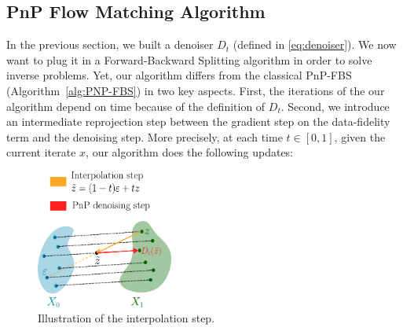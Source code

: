\documentclass{article} %
\theoremstyle{definition}
\begin{document}
\subsection{PnP Flow Matching Algorithm}
In the previous section, we built a denoiser $D_t$ (defined in \eqref{eq:denoiser}). We now want to plug it in a Forward-Backward Splitting algorithm in order to solve inverse problems. 
Yet, our algorithm differs from the classical PnP-FBS (Algorithm~\ref{alg:PNP-FBS}) in two key aspects.
First, the iterations of the our algorithm depend on time because of the definition of $D_t$.
Second, we introduce an intermediate reprojection step between the gradient step on the data-fidelity term and the denoising step.
More precisely, at each time $t \in [0,1]$, given the current iterate $x$,
our algorithm does the following updates:
\begin{figure} 
    \centering
    \vspace{1.6cm}
    \includegraphics[width=4.5cm]{figures/interpolationstep.pdf} 
    \caption{Illustration of the interpolation step. \label{fig:OTEX_Interpolation}}
\end{figure}
\end{document}
